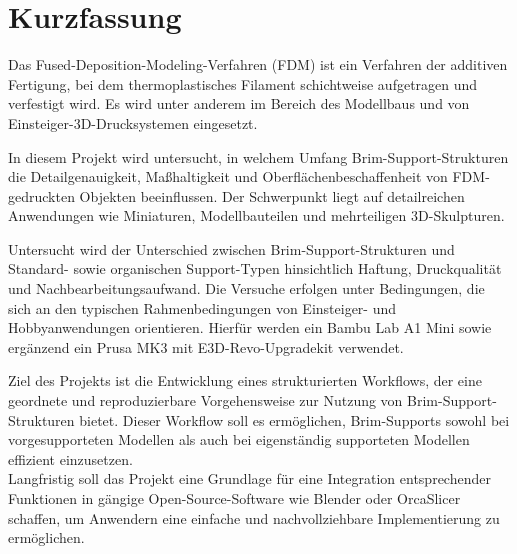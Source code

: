 \chapter*{Kurzfassung}
Das Fused-Deposition-Modeling-Verfahren (FDM) ist ein Verfahren der additiven Fertigung, bei dem thermoplastisches Filament schichtweise aufgetragen und verfestigt wird. Es wird unter anderem im Bereich des Modellbaus und von Einsteiger-3D-Drucksystemen eingesetzt.

In diesem Projekt wird untersucht, in welchem Umfang Brim-Support-Strukturen die Detailgenauigkeit, Maßhaltigkeit und Oberflächenbeschaffenheit von FDM-gedruckten Objekten beeinflussen. Der Schwerpunkt liegt auf detailreichen Anwendungen wie Miniaturen, Modellbauteilen und mehrteiligen 3D-Skulpturen.

Untersucht wird der Unterschied zwischen Brim-Support-Strukturen und Standard- sowie organischen Support-Typen hinsichtlich Haftung, Druckqualität und Nachbearbeitungsaufwand. Die Versuche erfolgen unter Bedingungen, die sich an den typischen Rahmenbedingungen von Einsteiger- und Hobbyanwendungen orientieren. Hierfür werden ein Bambu Lab A1 Mini sowie ergänzend ein Prusa MK3 mit E3D-Revo-Upgradekit verwendet.

Ziel des Projekts ist die Entwicklung eines strukturierten Workflows, der eine geordnete und reproduzierbare Vorgehensweise zur Nutzung von Brim-Support-Strukturen bietet. Dieser Workflow soll es ermöglichen, Brim-Supports sowohl bei vorgesupporteten Modellen als auch bei eigenständig supporteten Modellen effizient einzusetzen.\\
Langfristig soll das Projekt eine Grundlage für eine Integration entsprechender Funktionen in gängige Open-Source-Software wie Blender oder OrcaSlicer schaffen, um Anwendern eine einfache und nachvollziehbare Implementierung zu ermöglichen.